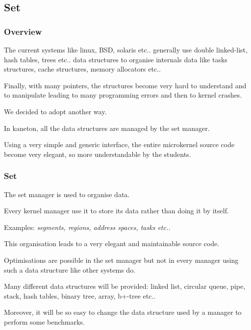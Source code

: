%
%

\subsection{Set}


\begin{frame}
  \frametitle{Overview}

  The current systems like linux, BSD, solaris etc.. generally use
  double linked-list, hash tables, trees etc.. data structures to
  organise internals data like tasks structures, cache structures,
  memory allocators etc..

  \nl

  Finally, with many pointers, the structures become very hard to understand
  and to manipulate leading to many programming errors and then to kernel
  crashes.

  \nl

  We decided to adopt another way.

  \nl

  In kaneton, all the data structures are managed by the set manager.

  \nl

  Using a very simple and generic interface, the entire microkernel source
  code become very elegant, so more understandable by the students.
\end{frame}


\begin{frame}
  \frametitle{Set}

  The set manager is used to organise data.

  \nl

  Every kernel manager use it to store its data rather than doing it
  by itself.

  \nl

  Examples: \textit{segments, regions, address spaces, tasks etc..}

  \nl

  This organisation leads to a very elegant and maintainable source code.

  \nl

  Optimisations are possible in the set manager \alert{but} not in every
  manager using such a data structure like other systems do.

  \nl

  Many different data structures will be provided: linked list, circular
  queue, pipe, stack, hash tables, binary tree, array, b+-tree etc..

  \nl

  Moreover, it will be so easy to change the data structure used by a manager
  to perform some benchmarks.
\end{frame}

